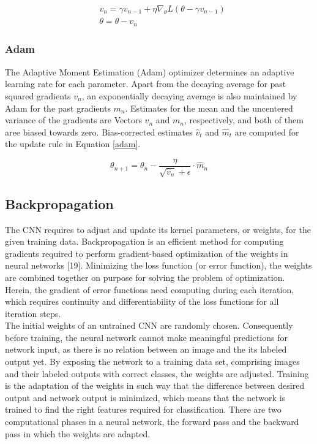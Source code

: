     \begin{equation}
        \begin{aligned}
            & v_n = \gamma v_{n-1} + \eta \nabla_{\theta}L(\theta - \gamma v_{n-1}) \\
            & \theta= \theta - v_{n}
        \end{aligned}
        \label{nag}
    \end{equation}

    \subsubsection{Adam}
    The Adaptive Moment Estimation (Adam) optimizer \cite{DBLP:journals/corr/KingmaB14} determines an adaptive learning rate for each parameter. Apart from the decaying average for past squared gradients $v_n$, an exponentially decaying average is also maintained by Adam for the past gradients $m_n$. Estimates for the mean and the uncentered variance of the gradients are Vectors $v_n$ and $m_n$, respectively, and both of them aree biased towards zero. Bias-corrected estimates $\hat{v}_t$ and $\hat{m}_t$ are computed for the update rule in Equation \ref{adam}.

    \begin{equation}
        \theta_{n+1} = \theta_{n} - \frac{\eta}{\sqrt{\hat{v}_n} + \epsilon}\cdot \hat{m}_n
    \end{equation}

    \subsection{Backpropagation}
     The CNN requires to adjust and update its kernel parameters, or weights, for the given training data. Backpropagation\cite{werbos1990backpropagation} is an efficient method for computing gradients required to perform gradient-based optimization of the weights in neural networks [19]. Minimizing the loss function (or error function), the weights are combined together on purpose for solving the problem of optimization. Herein, the gradient of error functions need computing during each iteration, which requires continuity and differentiability of the loss functions for all iteration steps.\\

    The initial weights of an untrained CNN are randomly chosen. Consequently before training, the neural network cannot make meaningful predictions for network input, as there is no relation between an image and the its labeled output yet. By exposing the network to a training data set, comprising images and their labeled outputs with correct classes, the weights are adjusted. Training is the adaptation of the weights in such way that the difference between desired output and network output is minimized, which means that the network is trained to find the right features required for classification. There are two computational phases in a neural network, the forward pass and the backward pass in which the weights are adapted.

